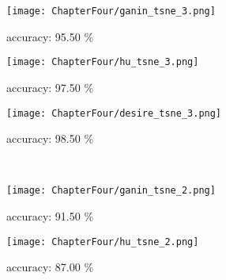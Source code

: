 \begin{figure}[ht!]
    \begin{minipage}[t!]{0.015\textwidth}
    \end{minipage}
    \begin{minipage}[t!]{0.985\textwidth}
        \captionsetup[subfigure]{labelformat=empty}
        \centering
        \begin{subfigure}{0.325\textwidth}
            \centering
            \texttt{[image: ChapterFour/ganin\_tsne\_3.png]}
            \caption{accuracy: 95.50 \%}
        \end{subfigure}
        \hfill
        \begin{subfigure}{0.325\textwidth}
            \centering
            \texttt{[image: ChapterFour/hu\_tsne\_3.png]}
            \caption{accuracy: 97.50 \%}
        \end{subfigure}
        \hfill
        \begin{subfigure}{0.325\textwidth}
            \centering
            \texttt{[image: ChapterFour/desire\_tsne\_3.png]}
            \caption{accuracy: 98.50 \%}
        \end{subfigure}
    \end{minipage}
    \\ \vspace{0.5 cm}
    \begin{minipage}[t!]{0.015\textwidth}
    \end{minipage}
    \begin{minipage}[t!]{0.985\textwidth}
        \captionsetup[subfigure]{labelformat=empty}
        \begin{subfigure}{0.325\textwidth}
            \centering
            \texttt{[image: ChapterFour/ganin\_tsne\_2.png]}
            \caption{accuracy: 91.50 \%}
        \end{subfigure}
        \hfill
        \begin{subfigure}{0.325\textwidth}
            \centering
            \texttt{[image: ChapterFour/hu\_tsne\_2.png]}
            \caption{accuracy: 87.00 \%}
        \end{subfigure}
        \hfill
        \begin{subfigure}{0.325\textwidth}

\end{subfigure}
\end{minipage}
\end{figure}
